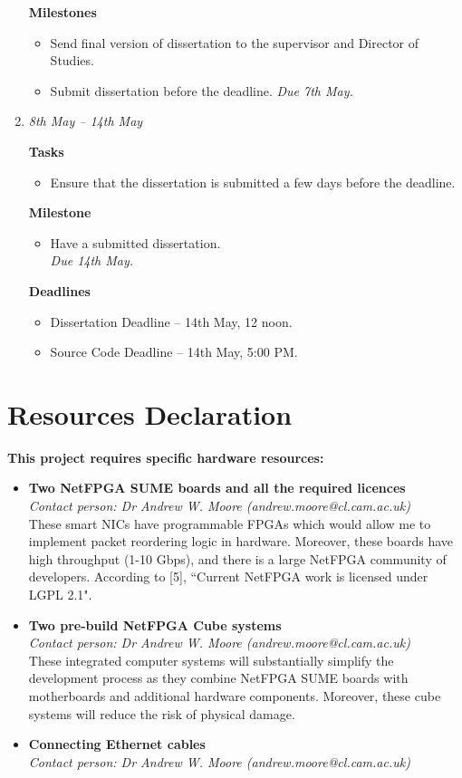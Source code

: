 \documentclass[a4paper,12pt]{article}
\begin{document}
\begin{enumerate}
\textbf{Milestones}
 \begin{itemize}
  \item Send final version of dissertation to the supervisor and Director of Studies.
  \item Submit dissertation before the deadline.
 \emph{ Due 7th May. }
 \end{itemize}






\item 
 \emph{8th May -- 14th May}
 
 \textbf{Tasks}
 \begin{itemize}
  \item Ensure that the dissertation is submitted a few days before the deadline.
 \end{itemize}


\textbf{Milestone}
 \begin{itemize}
  \item Have a submitted dissertation.\\
 \emph{ Due 14th May. }
 \end{itemize}

 \textbf{Deadlines}
 \begin{itemize}
  \item 
  Dissertation Deadline -- 14th May, 12 noon.
  \item
  Source Code Deadline -- 14th May, 5:00 PM.
 \end{itemize}
\end{enumerate}

\section*{Resources Declaration}
 \textbf{This project requires specific hardware resources: }
 \begin{itemize}
\item 
\textbf{Two NetFPGA SUME boards and all the required licences}\\
\textit{Contact person: Dr Andrew W. Moore (andrew.moore@cl.cam.ac.uk)}\\
These smart NICs have programmable FPGAs which would allow me to implement packet reordering logic in hardware.
Moreover, these boards have high throughput (1-10 Gbps), and there is a large NetFPGA community of developers.
According to [5], ``Current NetFPGA work is licensed under LGPL 2.1".

\item
\textbf{Two pre-build NetFPGA Cube systems}\\
\textit{Contact person: Dr Andrew W. Moore (andrew.moore@cl.cam.ac.uk)}\\
These integrated computer systems will substantially simplify the development process as they combine NetFPGA SUME boards with motherboards and additional hardware components.
Moreover, these cube systems will reduce the risk of physical damage.

\item
\textbf{Connecting Ethernet cables}\\
\textit{Contact person: Dr Andrew W. Moore (andrew.moore@cl.cam.ac.uk)}
 \end{itemize}
\end{document}
